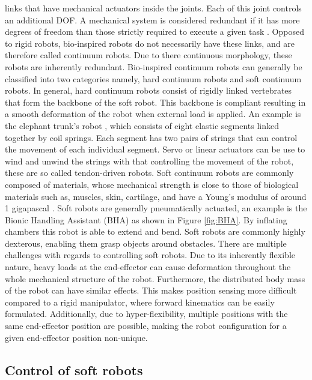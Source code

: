 links that have mechanical actuators inside the joints. Each of this joint controls an additional DOF. A mechanical system is considered redundant if it has more degrees of freedom than those strictly required to execute a given task \cite{chiaverini2016redundant}. Opposed to rigid robots, bio-inspired robots do not necessarily have these links, and are therefore called continuum robots. Due to there continuous morphology, these robots are inherently redundant. Bio-inspired continuum robots can generally be classified into two categories namely, hard continuum robots and soft continuum robots. In general, hard continuum robots consist of rigidly linked vertebrates that form the backbone of the soft robot. This backbone is compliant resulting in a smooth deformation of the robot when external load is applied. An example is the elephant trunk's robot \cite{cieslak1999elephant}, which consists of eight elastic segments linked together by coil springs. Each segment has two pairs of strings that can control the movement of each individual segment. Servo or linear actuators can be use to wind and unwind the strings with that controlling the movement of the robot, these are so called tendon-driven robots. Soft continuum robots are commonly composed of materials, whose mechanical strength is close to those of biological materials such as, muscles, skin, cartilage, and have a Young's modulus of around 1 gigapascal \cite{rus2015design}. Soft robots are generally pneumatically actuated, an example is the Bionic Handling Assistant (BHA) \cite{rolf2012constant} as shown in Figure \ref{fig:BHA}. By inflating chambers this robot is able to extend and bend. Soft robots are commonly highly dexterous, enabling them grasp objects around obstacles. There are multiple challenges with regards to controlling soft robots. Due to its inherently flexible nature, heavy loads at the end-effector can cause deformation throughout the whole mechanical structure of the robot. Furthermore, the distributed body mass of the robot can have similar effects. This makes position sensing more difficult compared to a rigid manipulator, where forward kinematics can be easily formulated. Additionally, due to hyper-flexibility, multiple positions with the same end-effector position are possible, making the robot configuration for a given end-effector position non-unique. 



\subsection{Control of soft robots}



